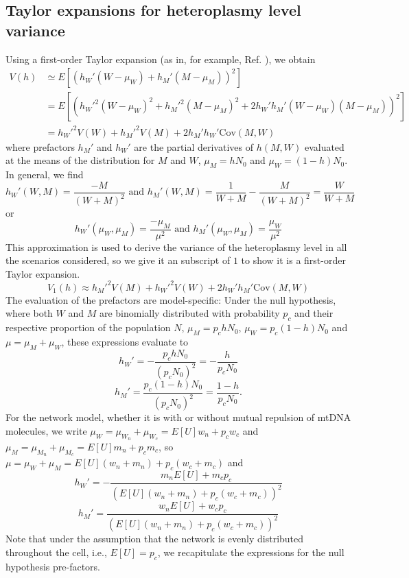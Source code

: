 \documentclass{article}
\begin{document}
\begin{appendices}
\subsection{Taylor expansions for heteroplasmy level variance}\label{app:taylor}
Using a first-order Taylor expansion (as in, for example, Ref. \cite{johnston2015stochastic}), we obtain
\begin{equation*}
    \begin{split}
    V(h) 
 & 
     \simeq  E[(h_W'(W-\mu_W)+h_M'(M-\mu_M))^2]\\
 & = E[(h_W'^2(W-\mu_W)^2+h_M'^2(M-\mu_M)^2
 + 2h_W'h_M'(W-\mu_W)(M-\mu_M))^2]\\
 & = h_W'^2V(W)+h_M'^2V(M)+2h_M'h_W'\mathrm{Cov}(M,W)
   \end{split}
\end{equation*}
where prefactors $h_M'$ and $h_W'$ are the partial derivatives of $h(M,W)$ evaluated at the means of the distribution for $M$ and $W$, $\mu_M=hN_0$ and $\mu_W=(1-h)N_0$. In general, we find
\begin{equation}
h_W'(W,M)=\frac{-M}{(W+M)^2} \text{\ \ and \ \ }
h_M'(W,M)=\frac{1}{W+M}-\frac{M}{(W+M)^2}=\frac{W}{W+M}
\end{equation}
or
\begin{equation}
h_W'(\mu_W,\mu_M)=\frac{-\mu_M}{\mu^2} \text{\ \ and \ \ }
h_M'(\mu_W,\mu_M)=\frac{\mu_W}{\mu^2}
\end{equation}
This approximation is used to derive the variance of the heteroplasmy level in all the scenarios considered, so we give it an subscript of $1$ to show it is a first-order Taylor expansion.
\begin{equation}\label{eq:app-v1h-general}
    V_1(h)\approx h_M'^2V(M) +
h_W'^2V(W)+2h_W'h_M'\mathrm{Cov}(M,W)
\end{equation}
The evaluation of the prefactors are model-specific: Under the null hypothesis, where both $W$ and $M$ are binomially distributed with probability $p_c$ and their respective proportion of the population $N$, $\mu_M=p_chN_0$, $\mu_W=p_c(1-h)N_0$ and $\mu = \mu_M+\mu_W$, these expressions evaluate to
\begin{equation}\label{eq:null-hW.prime}
h_W'=-\frac{p_chN_0}{(p_cN_0)^2}=-\frac{h}{p_cN_0}
\end{equation}
\begin{equation}\label{eq:null-hM.prime}
h_M'=\frac{p_c(1-h)N_0}{(p_cN_0)^2}=\frac{1-h}{p_cN_0}.
\end{equation}
For the network model, whether it is with or without mutual repulsion of mtDNA molecules, we write $\mu_W=\mu_{W_n}+\mu_{W_c}=E[U] w_n +p_cw_c$ and $\mu_M=\mu_{M_n}+\mu_{M_c}=E[U] m_n+p_cm_c$, so $\mu=\mu_W+\mu_M=E[U](w_n+m_n)+p_c(w_c+m_c)$ and
\begin{equation}\label{eq:net-hW.prime}
h_W'=-\frac{m_nE[U]+m_cp_c}{(E[U](w_n+m_n)+p_c(w_c+m_c))^2}
\end{equation}
\begin{equation}\label{eq:net-hM.prime}
h_M' = \frac{w_nE[U]+w_cp_c}{(E[U](w_n+m_n)+p_c(w_c+m_c))^2}
\end{equation}
Note that under the assumption that the network is evenly distributed throughout the cell, i.e., $E[U]=p_c$, we recapitulate the expressions for the null hypothesis pre-factors.

\end{appendices}
\end{document}
